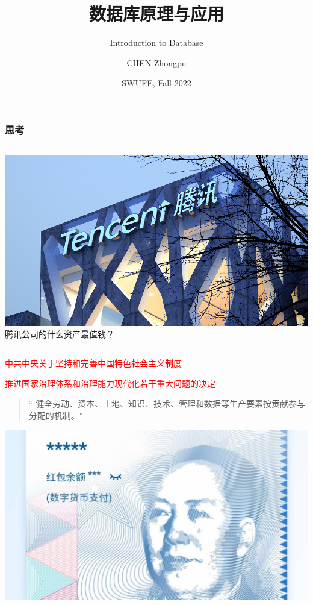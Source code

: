 \documentclass[aspectratio=169, 14pt]{beamer}
\title[Database Principles and Applications] %
{数据库原理与应用}
\subtitle{Introduction to Database}
\author[CHEN Zhongpu] %
{CHEN Zhongpu}
\institute[] %
{
  School of Computing and Artificial Intelligence \\
  \href{mailto:zpchen@swufe.edu.cn}{zpchen@swufe.edu.cn}
}
\date[] %
{SWUFE, Fall 2022}
\begin{document}
\frame{\titlepage}

\begin{frame}
\frametitle{思考}
\begin{columns}
    \includegraphics[width=.9\textwidth]{image/tencent}
    腾讯公司的什么资产最值钱？
\end{columns}
\end{frame}

\begin{frame}
    \begin{center}
        \textcolor{red}{\large 中共中央关于坚持和完善中国特色社会主义制度}

        \textcolor{red}{推进国家治理体系和治理能力现代化若干重大问题的决定}
    \end{center}
    \begin{quote}
        `` 健全劳动、资本、土地、知识、技术、管理和\alert{数据}等生产要素按贡献参与分配的机制。"
    \end{quote}
\pause
    \begin{center}
        \includegraphics[width=.5\textwidth]{image/rmb}
    \end{center}

\end{frame}
\end{document}
